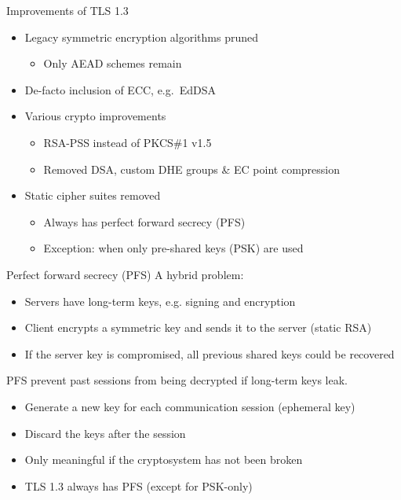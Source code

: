 \begin{frame}{Improvements of TLS 1.3}
  \begin{itemize}[<+(1)->]
    \item Legacy symmetric encryption algorithms pruned
    \begin{itemize}
      \item Only AEAD schemes remain
    \end{itemize}
    \item De-facto inclusion of ECC, e.g.\ EdDSA
    \item Various crypto improvements
    \par
    \begin{itemize}
      \item RSA-PSS instead of PKCS\#1 v1.5
      \item Removed DSA, custom DHE groups \&  EC point compression
    \end{itemize}
    \item Static cipher suites removed
    \par
    \begin{itemize}
      \item Always has perfect forward secrecy (PFS)
      \item Exception: when only pre-shared keys (PSK) are used
    \end{itemize}
  \end{itemize}
\end{frame}

\begin{frame}{Perfect forward secrecy (PFS)}
  A hybrid problem:
  \begin{itemize}[<+(1)->]
    \item Servers have long-term keys, e.g. signing and encryption
    \item Client encrypts a symmetric key and sends it to the server (static RSA)
    \item If the server key is compromised, all previous shared keys could be recovered
  \end{itemize}

  \vspace*{1em}

  \pause
  PFS prevent past sessions from being decrypted if long-term keys leak.
  \begin{itemize}[<+(1)->]
    \item Generate a new key for each communication session (ephemeral key)
    \item Discard the keys after the session
    \item Only meaningful if the cryptosystem has not been broken
    \item TLS 1.3 always has PFS (except for PSK-only)
  \end{itemize}
\end{frame}

